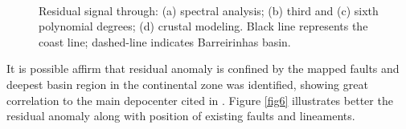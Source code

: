 \documentclass{sciposter}
\begin{document}
\begin{multicols}{3}
	\begin{figure}[ht!]
	\begin{center}
	\\
	\end{center}
	\caption{Residual signal through: (a) spectral analysis; (b) third and (c) sixth polynomial degrees; (d) crustal modeling. Black line represents the coast line; dashed-line indicates Barreirinhas basin.}
	\label{fig5}
	\end{figure}
	
	 It is possible affirm that residual anomaly is confined by the mapped faults and deepest basin region in the continental zone was identified, showing great correlation to the main depocenter cited in \cite{almeida2009quaternary}. Figure \ref{fig6} illustrates better the residual anomaly along with position of existing faults and lineaments.
	

\end{multicols}
\end{document}
